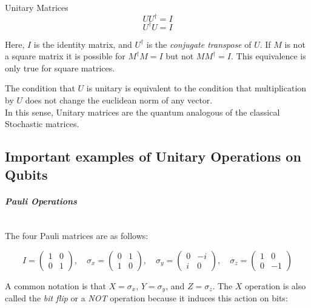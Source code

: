 \documentclass[svgnames]{article}     %
\begin{document}
\begin{mainbox}{Unitary Matrices}
  \[
  UU^\dagger = I 
  \]
  \[
  U^\dagger U = I
  \]  
\end{mainbox}

Here, $I$ is the identity matrix, and $U^\dagger$ is the \textit{conjugate
transpose} of $U$. If $M$ is not a square matrix it is possible for $M^\dagger
M = I$ but not  $M M^\dagger = I$. This equivalence is only true for square
matrices. 

The condition that  $U$ is unitary is equivalent to the condition that
multiplication by $U$ does not change the euclidean norm of any vector. \\

In this sense, Unitary matrices are the quantum analogous of the classical
Stochastic matrices. 

\subsection{Important examples of Unitary Operations on Qubits}

\paragraph{\textit{Pauli Operations}} \mbox{} \\

The four Pauli matrices are as follows: 

\[
I = \begin{pmatrix}
  1 & 0 \\ 0 & 1
\end{pmatrix}, \quad \sigma_x = \begin{pmatrix}
  0 & 1 \\[2px]
  1 & 0 
\end{pmatrix}, \quad \sigma_y = \begin{pmatrix}
  0 & -i \\[2px]
  i & 0 
\end{pmatrix}, \quad \sigma_z = \begin{pmatrix}
  1 & 0 \\[2px]
  0 & -1 
\end{pmatrix} 
\] \vspace{5px}

A common notation is that $X = \sigma_x$, $Y = \sigma_y$, and $Z = \sigma_z$.
The  $X$ operation is also called the \textit{bit flip} or a  \textit{NOT}
operation because it induces this action on bits: 
\end{document}
